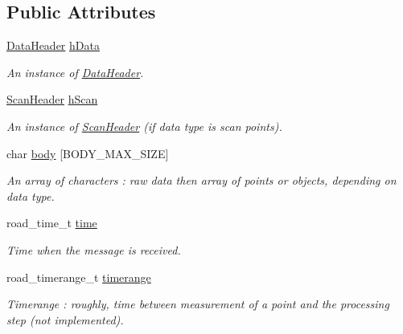 \subsection*{Public Attributes}
\begin{DoxyCompactItemize}
\item 
\hypertarget{classpacpus_1_1MessageLDMRS_a0de8de7be8864e2eb153c1b58b597a86}{\hyperlink{structpacpus_1_1DataHeader}{Data\-Header} \hyperlink{classpacpus_1_1MessageLDMRS_a0de8de7be8864e2eb153c1b58b597a86}{h\-Data}}\label{classpacpus_1_1MessageLDMRS_a0de8de7be8864e2eb153c1b58b597a86}

\begin{DoxyCompactList}\small\item\em An instance of \hyperlink{structpacpus_1_1DataHeader}{Data\-Header}. \end{DoxyCompactList}\item 
\hypertarget{classpacpus_1_1MessageLDMRS_aa67a394ee95860cf887abb671b53fc8f}{\hyperlink{structpacpus_1_1ScanHeader}{Scan\-Header} \hyperlink{classpacpus_1_1MessageLDMRS_aa67a394ee95860cf887abb671b53fc8f}{h\-Scan}}\label{classpacpus_1_1MessageLDMRS_aa67a394ee95860cf887abb671b53fc8f}

\begin{DoxyCompactList}\small\item\em An instance of \hyperlink{structpacpus_1_1ScanHeader}{Scan\-Header} (if data type is scan points). \end{DoxyCompactList}\item 
char \hyperlink{classpacpus_1_1MessageLDMRS_ad4f54e3688d2cca3f9175b9622dbed24}{body} \mbox{[}B\-O\-D\-Y\-\_\-\-M\-A\-X\-\_\-\-S\-I\-Z\-E\mbox{]}
\begin{DoxyCompactList}\small\item\em An array of characters \-: raw data then array of points or objects, depending on data type. \end{DoxyCompactList}\item 
\hypertarget{classpacpus_1_1MessageLDMRS_adf281676d8146037ecf51805d0e6217e}{road\-\_\-time\-\_\-t \hyperlink{classpacpus_1_1MessageLDMRS_adf281676d8146037ecf51805d0e6217e}{time}}\label{classpacpus_1_1MessageLDMRS_adf281676d8146037ecf51805d0e6217e}

\begin{DoxyCompactList}\small\item\em Time when the message is received. \end{DoxyCompactList}\item 
\hypertarget{classpacpus_1_1MessageLDMRS_a3f6e1a477d895f8f9d228669f559cb2d}{road\-\_\-timerange\-\_\-t \hyperlink{classpacpus_1_1MessageLDMRS_a3f6e1a477d895f8f9d228669f559cb2d}{timerange}}\label{classpacpus_1_1MessageLDMRS_a3f6e1a477d895f8f9d228669f559cb2d}

\begin{DoxyCompactList}\small\item\em Timerange \-: roughly, time between measurement of a point and the processing step (not implemented). \end{DoxyCompactList}\end{DoxyCompactItemize}


